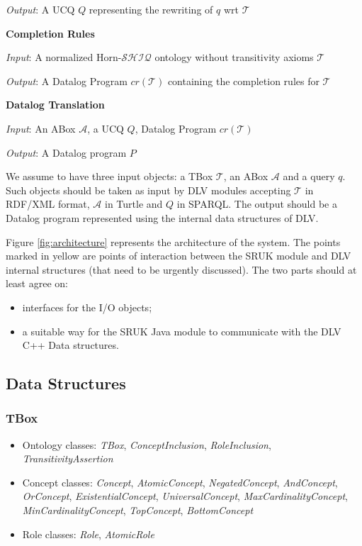 \documentclass[oneside]{book}
\newcommand{\shiq}{$\mathcal{SHIQ}$\xspace}
\newcommand{\hshiq}{Horn-\shiq\xspace}
\newcommand{\T}{\mathcal{T}}
\newcommand{\A}{\mathcal{A}}
\begin{document}
\textit{Output}: A UCQ $Q$ representing the rewriting of $q$ wrt $\T$

\noindent\textbf{Completion Rules}

\textit{Input}: A normalized \hshiq ontology without transitivity axioms $\T$

\textit{Output}: A Datalog Program $cr(\T)$ containing the completion rules for $\T$

\noindent\textbf{Datalog Translation}

\textit{Input}: An ABox  $\A$, a UCQ $Q$, Datalog Program $cr(\T)$

\textit{Output}: A Datalog program $P$


We assume to have three input objects: a TBox $\T$, an ABox $\A$ and a query $q$. Such objects should be taken as input by DLV modules accepting $\T$ in RDF/XML format, $\A$ in Turtle and $Q$ in SPARQL.
The output should be a Datalog program represented using the internal data structures of DLV.

Figure \ref{fig:architecture} represents the architecture of the system. The points marked in yellow are points of interaction between the SRUK module and DLV internal structures (that need to be urgently discussed).
%
The two parts should at least agree on:
\begin{itemize}
	\item interfaces for the I/O objects;
	\item a suitable way for the SRUK Java module to communicate with the DLV C++ Data structures. 
\end{itemize}



\subsection{Data Structures}

\subsubsection{TBox}
\begin{itemize}
\item Ontology classes: \textit{TBox},  \textit{ConceptInclusion},  \textit{RoleInclusion},  \textit{TransitivityAssertion}

\item Concept classes: \textit{Concept},  \textit{AtomicConcept},  \textit{NegatedConcept},  \textit{AndConcept},  \textit{OrConcept},  \textit{ExistentialConcept},  \textit{UniversalConcept},  \textit{MaxCardinalityConcept},  \textit{MinCardinalityConcept},  \textit{TopConcept},  \textit{BottomConcept}

\item Role classes: \textit{Role},  \textit{AtomicRole}
\end{itemize}
\end{document}
